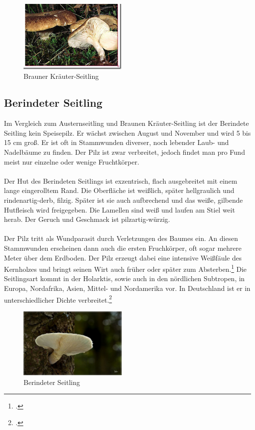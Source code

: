 \documentclass[a4paper,abstracton]{scrreprt}
\begin{document}
\begin{figure}[H]
\centering
\includegraphics[width=200px]{kraeuterseitling}
\caption[Brauner Kräuter-Seitling]{Brauner Kräuter-Seitling\protect\footnotemark}
\label{fig:kraeuterseitling}
\end{figure}

\subsection{Berindeter Seitling}
Im Vergleich zum Austernseitling und Braunen Kräuter-Seitling ist der Berindete Seitling kein Speisepilz. Er wächst zwischen August und November und wird 5 bis 15 cm groß. Er ist oft in Stammwunden diverser, noch lebender Laub- und Nadelbäume zu finden. Der Pilz ist zwar verbreitet, jedoch findet man pro Fund meist nur einzelne oder wenige Fruchtkörper.\\
\\Der Hut des Berindeten Seitlings ist exzentrisch, flach ausgebreitet mit einem lange eingerolltem Rand. Die Oberfläche ist weißlich, später hellgraulich und rindenartig-derb, filzig. Später ist sie auch aufbrechend und das weiße, gilbende Hutfleisch wird freigegeben. Die Lamellen sind weiß und laufen am Stiel weit herab. Der Geruch und Geschmack ist pilzartig-würzig.\\
\\Der Pilz tritt als Wundparasit durch Verletzungen des Baumes ein. An diesen Stammwunden erscheinen dann auch die ersten Fruchkörper, oft sogar mehrere Meter über dem Erdboden. Der Pilz erzeugt dabei eine intensive Weißfäule des Kernholzes und bringt seinen Wirt auch früher oder später zum Absterben.\footcite{tintling_berindet} Die Seitlingsart kommt in der Holarktis, sowie auch in den nördlichen Subtropen, in Europa, Nordafrika, Asien, Mittel- und Nordamerika vor. In Deutschland ist er in unterschiedlicher Dichte verbreitet.\footcite{faktenuber_berindet}

\begin{figure}[H]
\centering
\includegraphics[width=200px]{berindeter_seitling}
\caption[Berindeter Seitling]{Berindeter Seitling\protect\footnotemark}
\label{fig:berindeter_seitling}
\end{figure}
\end{document}
